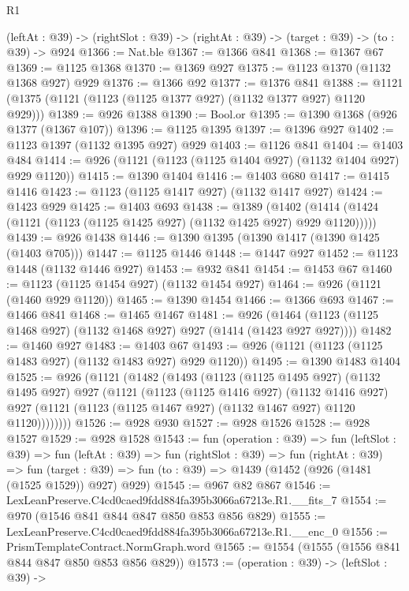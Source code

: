 \begin{lexlean}{R1}
\begin{coremodule}
  (leftAt : @39) -> (rightSlot : @39) -> (rightAt : @39) -> (target : @39) -> (to : @39) -> @924
@1366 := Nat.ble
@1367 := @1366 @841
@1368 := @1367 @67
@1369 := @1125 @1368
@1370 := @1369 @927
@1375 := @1123 @1370 (@1132 @1368 @927) @929
@1376 := @1366 @92
@1377 := @1376 @841
@1388 := @1121 (@1375 (@1121 (@1123 (@1125 @1377 @927) (@1132 @1377 @927) @1120 @929)))
@1389 := @926 @1388
@1390 := Bool.or
@1395 := @1390 @1368 (@926 @1377 (@1367 @107))
@1396 := @1125 @1395
@1397 := @1396 @927
@1402 := @1123 @1397 (@1132 @1395 @927) @929
@1403 := @1126 @841
@1404 := @1403 @484
@1414 := @926 (@1121 (@1123 (@1125 @1404 @927) (@1132 @1404 @927) @929 @1120))
@1415 := @1390 @1404
@1416 := @1403 @680
@1417 := @1415 @1416
@1423 := @1123 (@1125 @1417 @927) (@1132 @1417 @927)
@1424 := @1423 @929
@1425 := @1403 @693
@1438 := @1389
    (@1402 (@1414 (@1424 (@1121 (@1123 (@1125 @1425 @927) (@1132 @1425 @927) @929 @1120)))))
@1439 := @926 @1438
@1446 := @1390 @1395 (@1390 @1417 (@1390 @1425 (@1403 @705)))
@1447 := @1125 @1446
@1448 := @1447 @927
@1452 := @1123 @1448 (@1132 @1446 @927)
@1453 := @932 @841
@1454 := @1453 @67
@1460 := @1123 (@1125 @1454 @927) (@1132 @1454 @927)
@1464 := @926 (@1121 (@1460 @929 @1120))
@1465 := @1390 @1454
@1466 := @1366 @693
@1467 := @1466 @841
@1468 := @1465 @1467
@1481 := @926 (@1464 (@1123 (@1125 @1468 @927) (@1132 @1468 @927) @927 (@1414 (@1423 @927 @927))))
@1482 := @1460 @927
@1483 := @1403 @67
@1493 := @926 (@1121 (@1123 (@1125 @1483 @927) (@1132 @1483 @927) @929 @1120))
@1495 := @1390 @1483 @1404
@1525 := @926
    (@1121
      (@1482
        (@1493
          (@1123
            (@1125 @1495 @927)
            (@1132 @1495 @927)
            @927
            (@1121
              (@1123
                (@1125 @1416 @927)
                (@1132 @1416 @927)
                @927
                (@1121 (@1123 (@1125 @1467 @927) (@1132 @1467 @927) @1120 @1120))))))))
@1526 := @928 @930
@1527 := @928 @1526
@1528 := @928 @1527
@1529 := @928 @1528
@1543 := fun (operation : @39) =>
  fun (leftSlot : @39) =>
  fun (leftAt : @39) =>
  fun (rightSlot : @39) =>
  fun (rightAt : @39) =>
  fun (target : @39) => fun (to : @39) => @1439 (@1452 (@926 (@1481 (@1525 @1529)) @927) @929)
@1545 := @967 @82 @867
@1546 := LexLeanPreserve.C4cd0caed9fdd884fa395b3066a67213e.R1.__fits_7
@1554 := @970 (@1546 @841 @844 @847 @850 @853 @856 @829)
@1555 := LexLeanPreserve.C4cd0caed9fdd884fa395b3066a67213e.R1.__enc_0
@1556 := PrismTemplateContract.NormGraph.word
@1565 := @1554 (@1555 (@1556 @841 @844 @847 @850 @853 @856 @829))
@1573 := (operation : @39) ->
  (leftSlot : @39) ->

\end{coremodule}
\end{lexlean}

